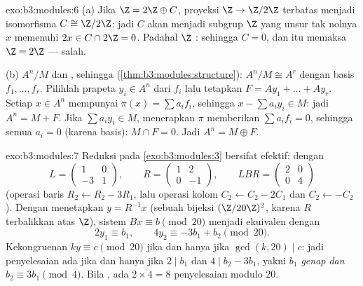 \begin{solution}{exo:b3:modules:6}
(a) Jika $\Z = 2\Z \oplus C$, proyeksi $\Z \to \Z/2\Z$
terbatas menjadi isomorfisma $C \cong \Z/2\Z$: jadi $C$ akan menjadi
subgrup $\Z$ yang unsur tak nolnya $x$ memenuhi $2x \in C
\cap 2\Z = 0$. Padahal $\Z$  : sehingga $C = 0$, dan itu memaksa $\Z =
2\Z$ --- salah.

(b)  $A^n/M$  dan  , sehingga 
(\cref{thm:b3:modules:structure}): $A^n/M \cong A^r$ dengan basis
$f_1, \dots, f_r$. Pilihlah prapeta $y_i \in A^n$ dari $f_i$
lalu tetapkan $F = Ay_1 + \dots + Ay_r$. Setiap $x \in A^n$ mempunyai $\pi(x)
= \sum a_if_i$, sehingga $x - \sum a_iy_i \in M$: jadi $A^n = M + F$. Jika
$\sum a_iy_i \in M$, menerapkan $\pi$ memberikan $\sum a_if_i = 0$,
sehingga semua $a_i = 0$ (karena basis): $M \cap F = 0$. Jadi $A^n = M \oplus
F$.
\end{solution}

\begin{solution}{exo:b3:modules:7}
Reduksi pada \cref{exo:b3:modules:3} bersifat efektif: dengan
\[
L = \begin{pmatrix} 1 & 0\\ -3 & 1\end{pmatrix},
\qquad
R = \begin{pmatrix} 1 & 2\\ 0 & -1 \end{pmatrix},
\qquad
LBR = \begin{pmatrix} 2 & 0\\ 0 & 4\end{pmatrix}
\]
(operasi baris $R_2 \leftarrow R_2 - 3R_1$, lalu operasi kolom
$C_2 \leftarrow C_2 - 2C_1$ dan $C_2 \leftarrow -C_2$). Dengan menetapkan
$y = R^{-1}x$ (sebuah bijeksi $(\Z/20\Z)^2$, karena $R$
terbalikkan atas $\Z$), sistem $Bx \equiv b \pmod{20}$ menjadi
ekuivalen dengan
\[
2y_1 \equiv b_1, \qquad 4y_2 \equiv -3b_1 + b_2 \pmod{20}.
\]
Kekongruenan $ky \equiv c \pmod{20}$  jika dan hanya jika
$\gcd(k, 20) \mid c$: jadi penyelesaian ada jika dan hanya jika $2 \mid b_1$ dan $4
\mid b_2 - 3b_1$, yakni \emph{$b_1$ genap dan $b_2 \equiv 3b_1
\pmod 4$}. Bila , ada $2 \times 4 = 8$ penyelesaian
modulo $20$.
\end{solution}

